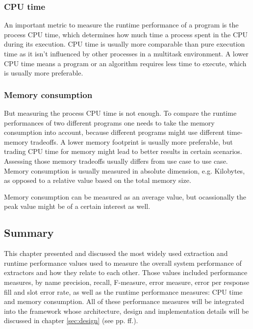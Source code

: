 \subsubsection{CPU time}
An important metric to measure the runtime performance of a program is the process CPU time, which determines how much time  a process spent in the CPU during its execution. CPU time is usually more comparable than pure execution time as it isn't influenced by other processes in a multitask environment. A lower CPU time means a program or an algorithm requires less time to execute, which is usually more preferable.

\subsubsection{Memory consumption}
But measuring the process CPU time is not enough. To compare the runtime performances of two different programs one needs to take the memory consumption into account, because different programs might use different time-memory tradeoffs. A lower memory footprint is usually more preferable, but trading CPU time for memory might lead to better results in certain scenarios. Assessing those memory tradeoffs usually differs from use case to use case. Memory consumption is usually measured in absolute dimension, e.g. Kilobytes, as opposed to a relative value based on the total memory size.

Memory consumption can be measured as an average value, but ocassionally the peak value might be of a certain interest as well.


\subsection{Summary}
This chapter presented and discussed the most widely used extraction and runtime performance values used to measure the overall system performance of extractors and how they relate to each other. Those values included performance measures, by name precision, recall, F-measure, error measure, error per response fill and slot error rate, as well as the runtime performance measures: CPU time and memory consumption. All of these performance measures will be integrated into the framework whose architecture, design and implementation details will be discussed in chapter \ref{sec:design} (see pp. \pageref{sec:design}ff.).